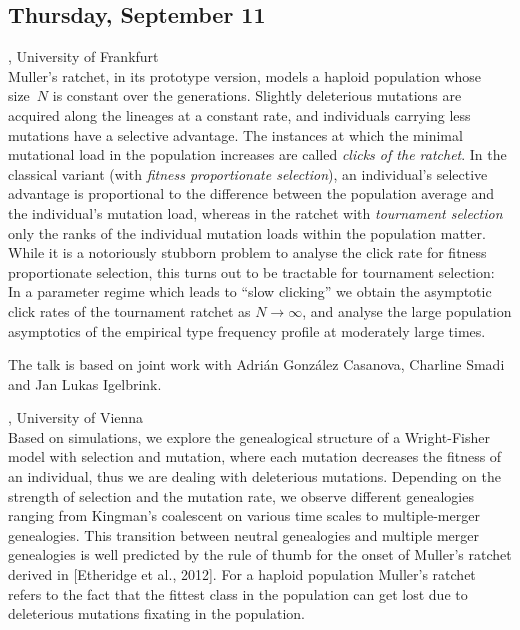 \documentclass[12pt,a4paper]{article}
\begin{document}
\subsection*{\sffamily Thursday, September 11}
\bigskip\bigskip
{}, University of Frankfurt \\[2ex] Muller's ratchet, in its prototype version, models a haploid population whose size~$N$ is constant over the generations. Slightly deleterious mutations are acquired along the lineages at a constant rate, and individuals carrying less mutations have a selective advantage. The instances at which the minimal mutational load in the population increases are called {\em clicks of the ratchet}.  In the classical variant (with {\em fitness proportionate selection}), an individual's selective advantage is proportional to the difference between the population average and the individual's mutation load, whereas in the ratchet with {\em  tournament selection}  only the ranks of the  individual mutation loads within the population matter. While it is a notoriously stubborn problem to analyse the click rate for fitness proportionate selection, this turns out to be tractable for tournament selection:   In a parameter regime which leads to ``slow clicking'' we obtain the  asymptotic click rates of the tournament ratchet as $N\to \infty$, and analyse the large population asymptotics of the empirical type frequency profile at moderately large times. 

 The talk is based on joint work with Adri\'an Gonz\'alez Casanova, Charline Smadi and Jan Lukas Igelbrink. 

\bigskip\bigskip

, University of Vienna \\[2ex] Based on simulations, we explore the genealogical structure of a Wright-Fisher model with selection and mutation, where each mutation decreases the fitness of an individual, thus we are dealing with deleterious mutations. Depending on the strength of selection and the mutation rate, we observe different genealogies ranging from Kingman's coalescent on various time scales to multiple-merger genealogies. This transition between neutral genealogies and multiple merger genealogies is well predicted by the rule of thumb for the onset of Muller's ratchet derived in [Etheridge et al., 2012]. For a haploid population Muller's ratchet refers to the fact that the fittest class in the population can get lost due to deleterious mutations fixating in the population. 
\end{document}
